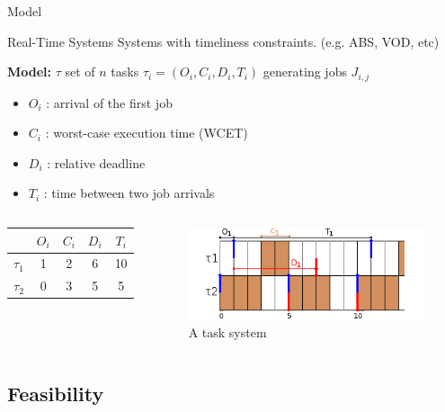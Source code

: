 \documentclass{beamer}
\begin{document}
	\begin{frame}{Model}
  \begin{block}{Real-Time Systems}
  Systems with timeliness constraints. (e.g. ABS, VOD, etc)
  \end{block}
  \textbf{Model:} $\tau$ set of $n$ tasks $\tau_i = (O_i, C_i, D_i, T_i)$ generating jobs $J_{i,j}$
      \begin{itemize}
      \item $O_i$ : arrival of the first job
      \item $C_i$ : worst-case execution time (WCET)
      \item $D_i$ : relative deadline
      \item $T_i$ : time between two job arrivals
    \end{itemize}

  \begin{columns}[c] %
\begin{center}
\begin{tabular}{|r|c|c|c|c|}
 \hline
  & $O_i$ & $C_i$ & $D_i$ & $T_i$ \\
 \hline
 $\tau_1$ & 1 & 2 & 6 & 10\\
 \hline
 $\tau_2$ & 0 & 3 & 5 & 5\\
 \hline
\end{tabular}
\end{center}

\begin{figure}[h]
\includegraphics[width=\textwidth]{figs/RTsystem_example.png}
\caption{A task system}
\label{fig:llf}
\end{figure}
  \end{columns}
\end{frame}

    \subsection{Feasibility}
\end{document}
